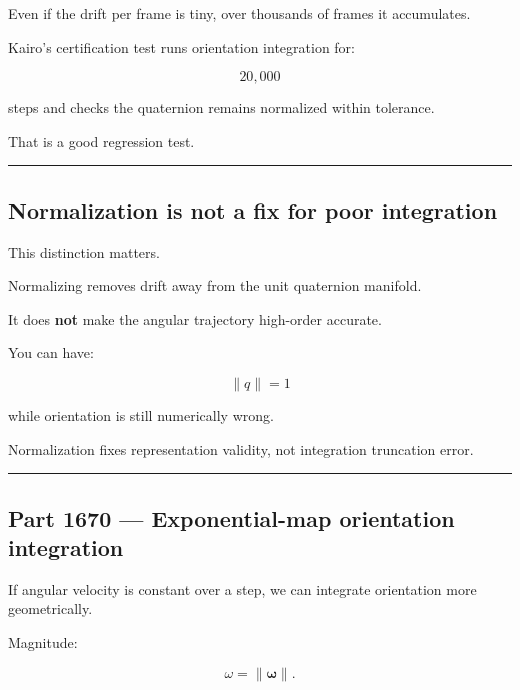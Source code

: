 Even if the drift per frame is tiny, over thousands of frames it accumulates.

Kairo's certification test runs orientation integration for:

\[
20,000
\]

steps and checks the quaternion remains normalized within tolerance.

That is a good regression test.

\begin{center}\rule{0.5\linewidth}{0.5pt}\end{center}

\subsection{Normalization is not a fix for poor integration}\label{06-engine-ii-ch037-normalization-is-not-a-fix-for-poor-integration}

\hypertarget{06-engine-ii-ch037-normalization-is-not-a-fix-for-poor-integration}{}

This distinction matters.

Normalizing removes drift away from the unit quaternion manifold.

It does \textbf{not} make the angular trajectory high-order accurate.

You can have:

\[
\|q\|=1
\]

while orientation is still numerically wrong.

Normalization fixes representation validity, not integration truncation error.

\begin{center}\rule{0.5\linewidth}{0.5pt}\end{center}

\subsection{Part 1670 --- Exponential-map orientation integration}\label{06-engine-ii-ch037-part-1670-exponential-map-orientation-integration}

\hypertarget{06-engine-ii-ch037-part-1670-exponential-map-orientation-integration}{}

If angular velocity is constant over a step, we can integrate orientation more geometrically.

Magnitude:

\[
\omega=
\|\boldsymbol\omega\|.
\]

